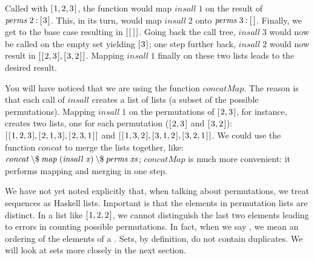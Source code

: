 \documentclass{scrreprt}
\newcommand{\Varid}[1]{\mathit{#1}}
\begin{document}
Called with \ensuremath{[\mskip1.5mu \mathrm{1},\mathrm{2},\mathrm{3}\mskip1.5mu]},
the function would map \ensuremath{\Varid{insall}\;\mathrm{1}}
on the result of \ensuremath{\Varid{perms}\;\mathrm{2}\mathbin{:}[\mskip1.5mu \mathrm{3}\mskip1.5mu]}.
This, in its turn, would map \ensuremath{\Varid{insall}\;\mathrm{2}}
onto \ensuremath{\Varid{perms}\;\mathrm{3}\mathbin{:}[\mskip1.5mu \mskip1.5mu]}.
Finally, we get to the base case resulting in \ensuremath{[\mskip1.5mu [\mskip1.5mu \mskip1.5mu]\mskip1.5mu]}.
Going back the call tree, 
\ensuremath{\Varid{insall}\;\mathrm{3}} would now be called on the empty set
yielding \ensuremath{[\mskip1.5mu \mathrm{3}\mskip1.5mu]}; 
one step further back, \ensuremath{\Varid{insall}\;\mathrm{2}} would 
now result in \ensuremath{[\mskip1.5mu [\mskip1.5mu \mathrm{2},\mathrm{3}\mskip1.5mu],[\mskip1.5mu \mathrm{3},\mathrm{2}\mskip1.5mu]\mskip1.5mu]}.
Mapping \ensuremath{\Varid{insall}\;\mathrm{1}} finally on these two lists
leads to the desired result.

You will have noticed that we are using the function $concatMap$.
The reason is that each call of $insall$ creates a list of lists
(a subset of the possible permutations). 
Mapping \ensuremath{\Varid{insall}\;\mathrm{1}} on the permutations of 
\ensuremath{[\mskip1.5mu \mathrm{2},\mathrm{3}\mskip1.5mu]}, for instance, creates two lists,
one for each permutation (\ensuremath{[\mskip1.5mu \mathrm{2},\mathrm{3}\mskip1.5mu]} and \ensuremath{[\mskip1.5mu \mathrm{3},\mathrm{2}\mskip1.5mu]}):
\ensuremath{[\mskip1.5mu [\mskip1.5mu \mathrm{1},\mathrm{2},\mathrm{3}\mskip1.5mu],[\mskip1.5mu \mathrm{2},\mathrm{1},\mathrm{3}\mskip1.5mu],[\mskip1.5mu \mathrm{2},\mathrm{3},\mathrm{1}\mskip1.5mu]\mskip1.5mu]} and
\ensuremath{[\mskip1.5mu [\mskip1.5mu \mathrm{1},\mathrm{3},\mathrm{2}\mskip1.5mu],[\mskip1.5mu \mathrm{3},\mathrm{1},\mathrm{2}\mskip1.5mu],[\mskip1.5mu \mathrm{3},\mathrm{2},\mathrm{1}\mskip1.5mu]\mskip1.5mu]}.
We could use the function $concat$
to merge the lists together, like:
\ensuremath{\Varid{concat}\mathbin{\char92 \$}\Varid{map}\;(\Varid{insall}\;\Varid{x})\mathbin{\char92 \$}\Varid{perms}\;\Varid{xs}};
$concatMap$ is much more convenient:
it performs mapping and merging in one step.

We have not yet noted explicitly
that, when talking about permutations,
we treat sequences as Haskell lists.
Important is that the elements in permutation lists
are distinct. In a list like \ensuremath{[\mskip1.5mu \mathrm{1},\mathrm{2},\mathrm{2}\mskip1.5mu]},
we cannot distinguish the last two elements
leading to errors in counting possible permutations.
In fact, when we say ,
we mean an ordering of the elements of a .
Sets, by definition, do not contain duplicates.
We will look at sets more closely in the next section.
\end{document}
